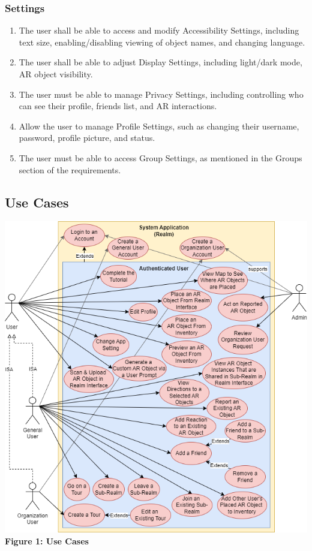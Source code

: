 \documentclass{article}
\begin{document}
\subsubsection{Settings}
\label{ssub:settings}
\begin{enumerate}[align=left, label=\textbf{S-FR\arabic*:}]
    \item The user shall be able to access and modify Accessibility Settings, including text size, enabling/disabling viewing of object names, and changing language.
    \item The user shall be able to adjust Display Settings, including light/dark mode, AR object visibility.
    \item The user must be able to manage Privacy Settings, including controlling who can see their profile, friends list, and AR interactions.
    \item Allow the user to manage Profile Settings, such as changing their username, password, profile picture, and status.
    \item The user must be able to access Group Settings, as mentioned in the Groups section of the requirements.
\end{enumerate}

\subsection{Use Cases}
\label{sub:use_cases}

\begin{center}
    \includegraphics[scale=0.5]{use_cases.png}\\
    \textbf{Figure 1: Use Cases}
\end{center}
\end{document}
